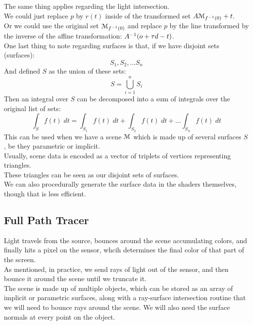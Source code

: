 \documentclass[12pt]{article}
\begin{document}
The same thing applies regarding the
light intersection. \\
We could just replace $p$
by $r(t)$
inside of the transformed set 
$A\mathcal{M}_{f^{-1}(0)} + t$. \\
Or we could use the original set
$\mathcal{M}_{f^{-1}(0)}$
and replace $p$
by the line transformed by the inverse of
the affine transformation: 
$A^{-1}(o + \tau d - t)$. \\

One last thing to note regarding surfaces
is that, if we have disjoint sets (surfaces):
\[ S_1, S_2, \dots S_n \]
And defined $S$ as the union of these sets:
\[ S = \bigcup_{i = 1}^n S_i \]
Then an integral over $S$
can be decomposed into a sum of integrals
over the original list of sets:
\[ \int_S f(t)\;dt
= \int_{S_1} f(t)\;dt + \int_{S_2} f(t)\;dt +
\dots \int_{S_n} f(t)\;dt \]
This can be used when we have a scene
$\mathcal{M}$ which is made up of several surfaces
$S$, be they parametric or implicit. \\

Usually, scene data is encoded as a vector
of triplets of vertices representing triangles. \\
These triangles can be seen as our disjoint
sets of surfaces. \\
We can also procedurally generate the surface
data in the shaders themselves, though that is
less efficient. \\

\newpage

\subsection*{Full Path Tracer}

Light travels from the source, bounces around the
scene accumulating colors, and finally hits a pixel
on the sensor, whcih determines the final color
of that part of the screen. \\

As mentioned, in practice, we send rays of
light out of the sensor, and then bounce it around
the scene until we truncate it. \\

The scene is made up of multiple objects, which
can be stored as an array of implicit or parametric
surfaces, along with a ray-surface intersection
routine that we will need to bounce rays
around the scene. We will also need the
surface normals at every point on the object. \\
\end{document}
